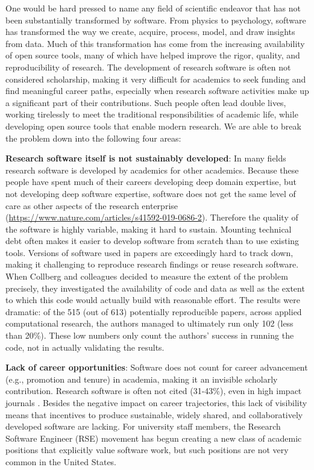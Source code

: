 \documentclass[
]{book}
\begin{document}
One would be hard pressed to name any field of scientific endeavor that has not been
substantially transformed by software. From physics to psychology, software has
transformed the way we create, acquire, process, model, and draw insights from data.
Much of this transformation has come from the increasing availability of open source tools,
many of which have helped improve the rigor, quality, and reproducibility of research.
The development of research software is often not considered scholarship, making it very
difficult for academics to seek funding and find meaningful career paths, especially when
research software activities make up a significant part of their contributions. Such people
often lead double lives, working tirelessly to meet the traditional responsibilities of
academic life, while developing open source tools that enable modern research. We are able
to break the problem down into the following four areas:

\textbf{Research software itself is not sustainably developed}: In many fields research software
is developed by academics for other academics. Because these people have spent much of their
careers developing deep domain expertise, but not developing deep software expertise,
software does not get the same level of care as other aspects of the research enterprise
(\url{https://www.nature.com/articles/s41592-019-0686-2}).
Therefore the quality of the software is highly variable, making it hard to sustain. Mounting
technical debt often makes it easier to develop software from scratch than to use existing
tools. Versions of software used in papers are exceedingly hard to track down, making it
challenging to reproduce research findings or reuse research software. When Collberg and
colleagues \citep{collberg2014measuring, collberg2015repeatability} decided to measure the extent
of the problem precisely, they investigated the availability of code and data as well as the
extent to which this code would actually build with reasonable effort. The results were
dramatic: of the 515 (out of 613) potentially reproducible papers, across applied
computational research, the authors managed to ultimately run only 102 (less than 20\%).
These low numbers only count the authors' success in running the code, not in actually
validating the results.

\textbf{Lack of career opportunities}: Software does not count for career advancement (e.g.,
promotion and tenure) in academia, making it an invisible scholarly contribution. Research
software is often not cited (31-43\%), even in high impact journals \citep{howison2016software}.
Besides the negative impact on career trajectories, this lack of visibility means that
incentives to produce sustainable, widely shared, and collaboratively developed software
are lacking. For university staff members, the Research Software Engineer (RSE) movement
has begun creating a new class of academic positions that explicitly value software work,
but such positions are not very common in the United States.
\end{document}
